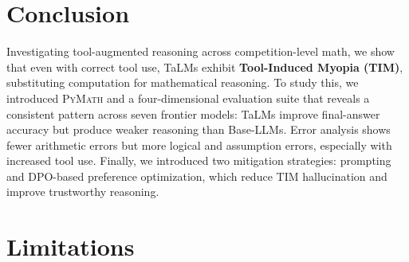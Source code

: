 \documentclass[11pt]{article}
\def \dataset{\textsc{PyMath}\xspace}
\def \task{\textsc{TIM}\xspace}
\begin{document}





\section{Conclusion}
Investigating tool-augmented reasoning across competition-level math, we show that even with correct tool use, TaLMs exhibit \textbf{Tool-Induced Myopia (\task)}, substituting computation for mathematical reasoning. To study this, we introduced \dataset{} and a four-dimensional evaluation suite that reveals a consistent pattern across seven frontier models: TaLMs improve final-answer accuracy but produce weaker reasoning than Base-LLMs. Error analysis shows fewer arithmetic errors but more logical and assumption errors, especially with increased tool use. Finally, we introduced two mitigation strategies: prompting and DPO-based preference optimization, which reduce \task{} hallucination and improve trustworthy reasoning.


\section{Limitations}
\end{document}
